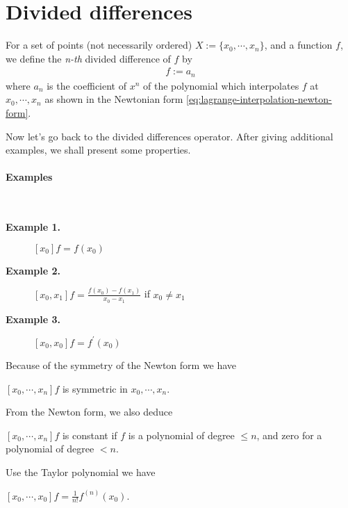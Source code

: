 \section{Divided differences}
\noindent
\begin{definition}
For a set of points (not necessarily ordered) $X:=\{ x_0, \cdots,x_n\}$, and a function $f$, we define the \textit{n-th} divided difference of $f$ by 
\begin{align}
[ x_0,\cdots,x_n ] f := a_n
\end{align}
where $a_n$ is the coefficient of $x^n$ of the polynomial which interpolates $f$ at $x_0,\cdots,x_n$ as shown in the Newtonian form \ref{eq:lagrange-interpolation-newton-form}.
\end{definition}

Now let's go back to the divided differences operator. After giving additional examples, we shall present some properties.
\paragraph{Examples} \mbox{}\\
\begin{description}
  \item[\textbf{Example 1.}] $[x_0]f=f(x_0)$ 
  \item[\textbf{Example 2.}] $[x_0, x_1]f=\frac{f(x_0)-f(x_1)}{x_0-x_1}$ if $x_0 \neq x_1$
  \item[\textbf{Example 3.}] $[x_0, x_0]f=f^\prime(x_0)$ 
\end{description}
%
Because of the symmetry of the Newton form we have
\begin{proposition}
  $[x_0,\cdots,x_n]f$ is symmetric in $x_0,\cdots,x_n$. 
\end{proposition}
%
From the Newton form, we also deduce
\begin{proposition}
  $[x_0,\cdots,x_n]f$ is constant if $f$ is a polynomial of degree $\leq n$, and zero for a polynomial of degree $< n$.
\end{proposition}
%
Use the Taylor polynomial we have
\begin{proposition}
   $[x_0,\cdots,x_0]f = \frac{1}{n!}f^{(n)}(x_0)$.
\end{proposition}


